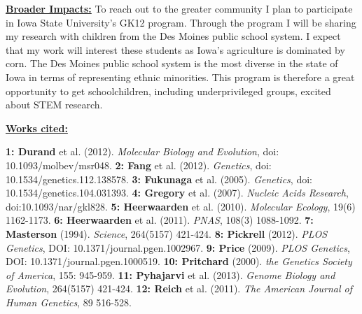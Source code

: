 \documentclass[12pt]{amsart}
\begin{document}
\hfill\break \textbf{\underline{Broader Impacts:} }
To reach out to the greater community I plan to participate in Iowa State University's GK12 program.  Through the program I will be sharing my research with children from the Des Moines public school system.  
I expect that my work will interest these students as Iowa's agriculture is dominated by corn.
The Des Moines public school system is the most diverse in the state of Iowa in terms of representing ethnic minorities.  This program is therefore a great opportunity to get schoolchildren, including underprivileged groups, excited about STEM research.  

\hfill\break \textbf{\underline{Works cited:}}
\small{ 
\textbf{1: Durand} et al. (2012). \textit{Molecular Biology and Evolution}, doi: 10.1093/molbev/msr048.
\textbf{2: Fang} et al. (2012). \textit{Genetics}, doi: 10.1534/genetics.112.138578. 
\textbf{3: Fukunaga} et al. (2005). \textit{Genetics}, doi: 10.1534/genetics.104.031393. 
\textbf{4: Gregory} et al. (2007). \textit{Nucleic Acids Research}, doi:10.1093/nar/gkl828. 
\textbf{5: Heerwaarden} et al. (2010). \textit{Molecular Ecology}, 19(6) 1162-1173. 
\textbf{6: Heerwaarden} et al. (2011). \textit{PNAS}, 108(3) 1088-1092.  
\textbf{7: Masterson} (1994). \textit{Science}, 264(5157) 421-424.  
\textbf{8: Pickrell} (2012). \textit{PLOS Genetics}, DOI: 10.1371/journal.pgen.1002967. 
\textbf{9: Price} (2009). \textit{PLOS Genetics}, DOI: 10.1371/journal.pgen.1000519. 
\textbf{10: Pritchard} (2000). \textit{the Genetics Society of America}, 155: 945-959.  
\textbf{11: Pyhajarvi} et al. (2013). \textit{Genome Biology and Evolution}, 264(5157) 421-424.  
\textbf{12: Reich} et al. (2011). \textit{The American Journal of Human Genetics}, 89 516-528.

}
\end{document}
